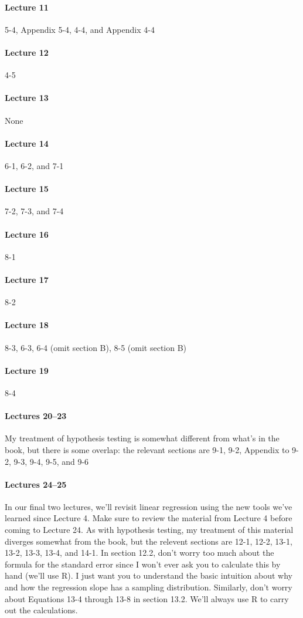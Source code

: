 \documentclass[12pt]{article}
\begin{document}
\paragraph{Lecture 11} 5-4, Appendix 5-4, 4-4, and Appendix 4-4
\paragraph{Lecture 12} 4-5
\paragraph{Lecture 13} None
\paragraph{Lecture 14} 6-1, 6-2, and 7-1
\paragraph{Lecture 15} 7-2, 7-3, and 7-4
\paragraph{Lecture 16} 8-1
\paragraph{Lecture 17} 8-2
\paragraph{Lecture 18} 8-3, 6-3, 6-4 (omit section B), 8-5 (omit section B)
\paragraph{Lecture 19} 8-4
\paragraph{Lectures 20--23} My treatment of hypothesis testing is somewhat different from what's in the book, but there is some overlap: the relevant sections are 9-1, 9-2, Appendix to 9-2, 9-3, 9-4, 9-5, and 9-6
\paragraph{Lectures 24--25} 
In our final two lectures, we'll revisit linear regression using the new tools we've learned since Lecture 4. 
Make sure to review the material from Lecture 4 before coming to Lecture 24. 
As with hypothesis testing, my treatment of this material diverges somewhat from the book, but the relevent sections are 12-1, 12-2, 13-1, 13-2, 13-3, 13-4, and 14-1. 
In section 12.2, don't worry too much about the formula for the standard error since I won't ever ask you to calculate this by hand (we'll use R). 
I just want you to understand the basic intuition about why and how the regression slope has a sampling distribution.
Similarly, don't worry about Equations 13-4 through 13-8 in section 13.2. 
We'll always use R to carry out the calculations.
\end{document}
